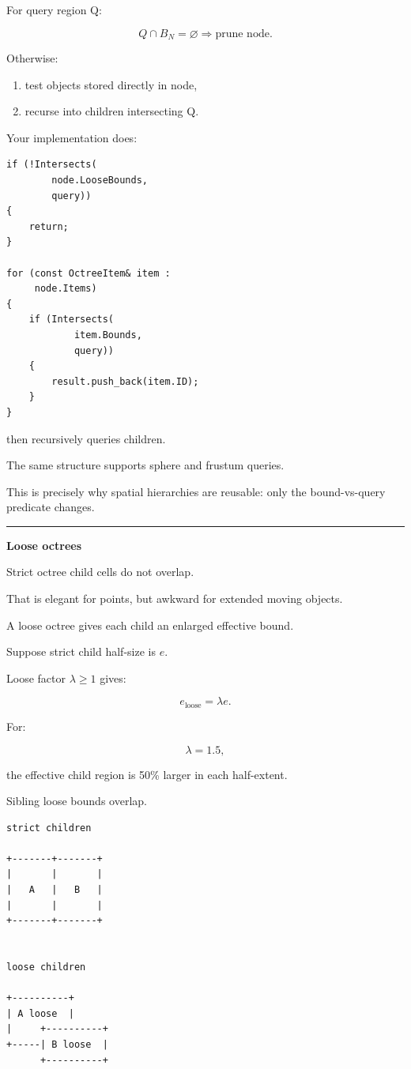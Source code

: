 For query region Q:

\[
Q\cap B_N=\varnothing
\Rightarrow
\text{prune node}.
\]

Otherwise:

\begin{enumerate}
\def\labelenumi{\arabic{enumi}.}
\tightlist
\item
  test objects stored directly in node,
\item
  recurse into children intersecting Q.
\end{enumerate}

Your implementation does:

\begin{verbatim}
if (!Intersects(
        node.LooseBounds,
        query))
{
    return;
}

for (const OctreeItem& item :
     node.Items)
{
    if (Intersects(
            item.Bounds,
            query))
    {
        result.push_back(item.ID);
    }
}
\end{verbatim}

then recursively queries children.

The same structure supports sphere and frustum queries.

This is precisely why spatial hierarchies are reusable: only the bound-vs-query predicate changes.

\begin{center}\rule{0.5\linewidth}{0.5pt}\end{center}

\textbf{Loose octrees}

Strict octree child cells do not overlap.

That is elegant for points, but awkward for extended moving objects.

A loose octree gives each child an enlarged effective bound.

Suppose strict child half-size is \(e\).

Loose factor \(\lambda\ge1\) gives:

\[
e_{\text{loose}}
=
\lambda e.
\]

For:

\[
\lambda=1.5,
\]

the effective child region is 50\% larger in each half-extent.

Sibling loose bounds overlap.

\begin{verbatim}
strict children

+-------+-------+
|       |       |
|   A   |   B   |
|       |       |
+-------+-------+


loose children

+----------+
| A loose  |
|     +----------+
+-----| B loose  |
      +----------+
\end{verbatim}

